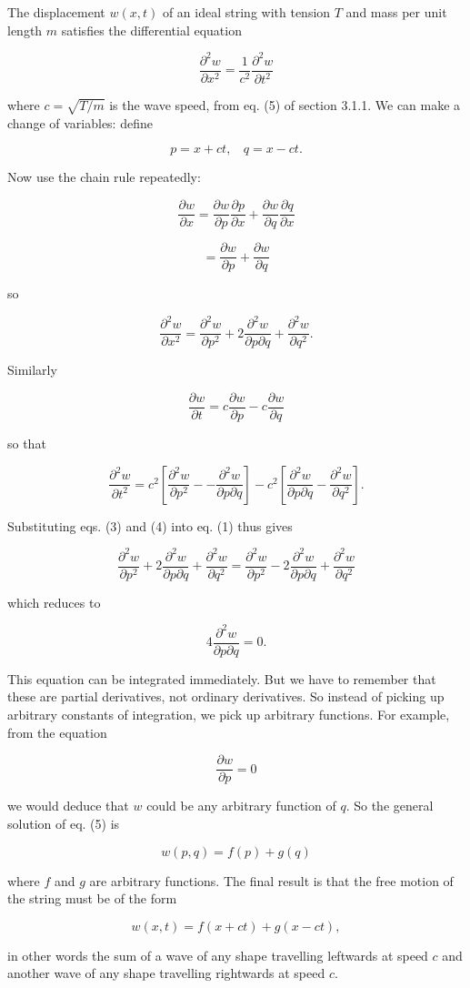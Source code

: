   The displacement $w(x,t)$ of an ideal string with tension $T$ and mass per 
  unit length $m$ satisfies the differential equation 

  $$\frac{\partial^2w}{\partial x^2}= \frac{1}{c^2} \frac{\partial^2w}{\partial 
  t^2}\tag{1}$$ 

  where $c=\sqrt{T/m}$ is the wave speed, from eq. (5) of section 3.1.1. We can 
  make a change of variables: define 

  $$p=x+ct,\mathrm{~~~~}q=x-ct. \tag{2}$$ 

  Now use the chain rule repeatedly: 

  $$\frac{\partial w}{\partial x}=\frac{\partial w}{\partial p}\frac{\partial 
  p}{\partial x}+\frac{\partial w}{\partial q}\frac{\partial q}{\partial x}$$ 

  $$=\frac{\partial w}{\partial p}+\frac{\partial w}{\partial q}$$ 

  so 

  $$\frac{\partial^2 w}{\partial x^2}=\frac{\partial^2 w}{\partial 
  p^2}+2\frac{\partial^2 w}{\partial p \partial q}+\frac{\partial^2 w}{\partial 
  q^2} . \tag{3}$$ 

  Similarly 

  $$\frac{\partial w}{\partial t}=c \frac{\partial w}{\partial p} -c 
  \frac{\partial w}{\partial q}$$ 

  so that 

  $$\frac{\partial^2 w}{\partial t^2}= c^2 \left[ \frac{\partial^2 w}{\partial 
  p^2} -- \frac{\partial^2 w}{\partial p \partial q} \right]-c^2 \left[ 
  \frac{\partial^2 w}{\partial p \partial q} -\frac{\partial^2 w}{\partial q^2} 
  \right] . \tag{4}$$ 

  Substituting eqs. (3) and (4) into eq. (1) thus gives 

  $$\frac{\partial^2 w}{\partial p^2}+2\frac{\partial^2 w}{\partial p \partial 
  q}+\frac{\partial^2 w}{\partial q^2} = \frac{\partial^2 w}{\partial 
  p^2}-2\frac{\partial^2 w}{\partial p \partial q}+\frac{\partial^2 w}{\partial 
  q^2}$$ 

  which reduces to 

  $$4\frac{\partial^2 w}{\partial p \partial q}=0.\tag{5}$$ 

  This equation can be integrated immediately. But we have to remember that 
  these are partial derivatives, not ordinary derivatives. So instead of 
  picking up arbitrary constants of integration, we pick up arbitrary 
  functions. For example, from the equation 

  $$\frac{\partial w}{\partial p}=0$$ 

  we would deduce that $w$ could be any arbitrary function of $q$. So the 
  general solution of eq. (5) is 

  $$w(p,q) = f(p) +g(q)$$ 

  where $f$ and $g$ are arbitrary functions. The final result is that the free 
  motion of the string must be of the form 

  $$w(x,t) = f(x+ct) + g(x-ct),\tag{6}$$ 

  in other words the sum of a wave of any shape travelling leftwards at speed 
  $c$ and another wave of any shape travelling rightwards at speed $c$. 
